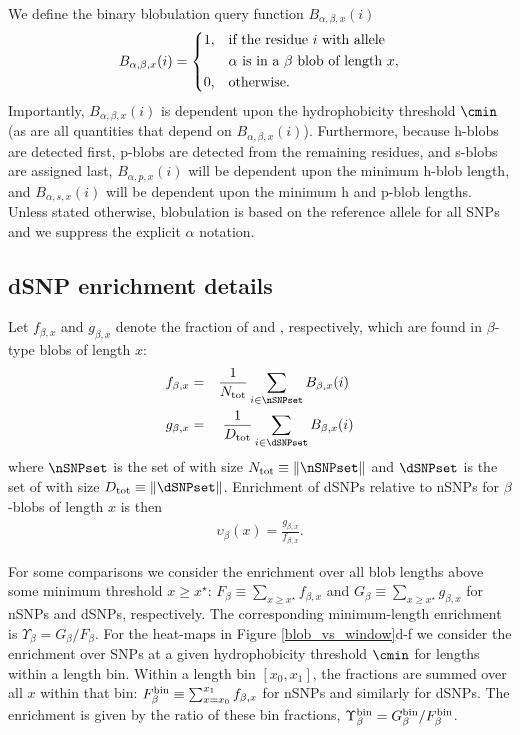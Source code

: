 We define the binary blobulation query function $B_{\alpha,\beta,x}(i)$  
\begin{equation}
B_{\alpha,\beta,x}(i) = \begin{cases*}
  1, & if the residue $i$ with allele\\& $\alpha$ is in a $\beta$ blob of length $x$,\\
  0, & otherwise.
\end{cases*}
\end{equation}
Importantly, $B_{\alpha,\beta,x}(i)$ is dependent upon the hydrophobicity threshold $\cmin$ (as are all quantities that depend on $B_{\alpha,\beta,x}(i)$). Furthermore, because h-blobs are detected first, p-blobs are detected from the remaining residues, and s-blobs are assigned last, $B_{\alpha,p,x}(i)$ will be dependent upon the minimum h-blob length, and $B_{\alpha,s,x}(i)$ will be dependent upon the minimum h and p-blob lengths. Unless stated otherwise, blobulation is based on the reference allele for all SNPs and we suppress the explicit $\alpha$ notation.

\subsection*{dSNP enrichment details}
Let $f_{\beta,x}$ and $g_{\beta,x}$ denote the fraction of \nSNPs and \dSNPs, respectively, which are found in $\beta$-type blobs of length $x$: 
\begin{eqnarray}
    f_{\beta,x} &=& \frac{1}{N_{\rm tot}}\sum_{i\in \nSNPset} B_{\beta,x}(i)\ \label{eq:f} \\
    g_{\beta,x} &=& \frac{1}{D_{\rm tot}}\sum_{i\in \dSNPset} B_{\beta,x}(i)\label{eq:g}
\end{eqnarray}
where $\nSNPset$ is the set of \nSNPs with size $N_{\rm tot} \equiv \|\nSNPset\|$ and $\dSNPset$ is the set of \dSNPs with size $D_{\rm tot} \equiv \|\dSNPset\|$. 
Enrichment of dSNPs relative to nSNPs for $\beta$-blobs of length $x$ is then 
\begin{eqnarray}
    \upsilon_\beta(x) = \frac{ g_{\beta,x}}{f_{\beta,x}}.
\end{eqnarray}

For some comparisons we consider the enrichment over all blob lengths above some minimum threshold $x\geq x^\star$: $F_{\beta} \equiv \sum_{x\geq x^\star} f_{\beta,x}$ and $G_{\beta} \equiv \sum_{x\geq x^\star} g_{\beta,x}$ for nSNPs and dSNPs, respectively. The corresponding minimum-length enrichment is $\Upsilon_\beta = G_{\beta}/F_{\beta}$. For the heat-maps in Figure \ref{blob_vs_window}d-f we consider the enrichment over SNPs at a given hydrophobicity threshold $\cmin$ for lengths within a length bin. Within a length bin $[x_0,x_1]$, the fractions are summed over all $x$ within that bin: $F_{\beta}^{\rm bin} \equiv \sum_{x=x_0}^{x_1} f_{\beta,x}$ for nSNPs and similarly for dSNPs. The enrichment is given by the ratio of these bin fractions, $\Upsilon_{\beta}^{\rm bin} = G_{\beta}^{\rm bin} / F_{\beta}^{\rm bin}$.

